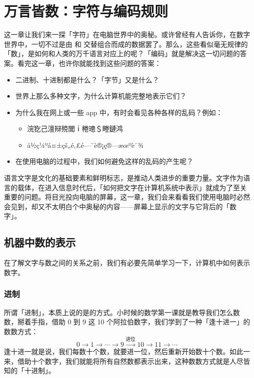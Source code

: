\chapter{万言皆数：字符与编码规则}
\label{cha:characters-and-encodings}

\begin{intro}
  这一章让我们来一探「字符」在电脑世界中的奥秘。或许曾经有人告诉你，在数字世界中，一切不过是由  和  交替组合而成的数据罢了。那么，这些看似毫无规律的「数」，是如何和人类的万千语言对应上的呢？「编码」就是解决这一切问题的答案。看完这一章，也许你就能找到这些问题的答案：
  \begin{itemize}
    \item 二进制、十进制都是什么？「字节」又是什么？
    \item 世界上那么多种文字，为什么计算机能完整地表示它们？
    \item 为什么我在网上或一些 app 中，有时会看见各种各样的乱码？例如：
      \begin{itemize}
        \item 浣犵己澶辩殑閭ｉ棬璁＄畻鏈鸿
        \item ä½ç¼ºå¤±çš„é‚£é—¨è®¡ç®—æœºè¯¾
      \end{itemize}
    \item 在使用电脑的过程中，我们如何避免这样的乱码的产生呢？
  \end{itemize}
\end{intro}

语言文字是文化的基础要素和鲜明标志，是推动人类进步的重要力量。文字作为语言的载体，在进入信息时代后，「如何把文字在计算机系统中表示」就成为了至关重要的问题。将目光投向电脑的屏幕，这一章，我们会来看看我们使用电脑时必然会见到，却又不太明白个中奥秘的内容——屏幕上显示的文字与它背后的「数字」。

\section{机器中数的表示}

在了解文字与数之间的关系之前，我们有必要先简单学习一下，计算机中如何表示数字。

\subsection{进制}

所谓「进制」，本质上说的是的方式。小时候的数学第一课就是教导我们怎么数数，掰着手指，借助 0 到 9 这 10 个阿拉伯数字，我们学到了一种「逢十进一」的数数方式：
\[
  0 \to 1 \to \cdots \to 9 \xrightarrow{\text{进位}} 10 \to 11 \to \cdots
\]
逢十进一就是说，我们每数十个数，就要进一位，然后重新开始数十个数。如此一来，借助十个数字，我们就能将所有自然数都表示出来，这种数数方式就是人尽皆知的「十进制」。


